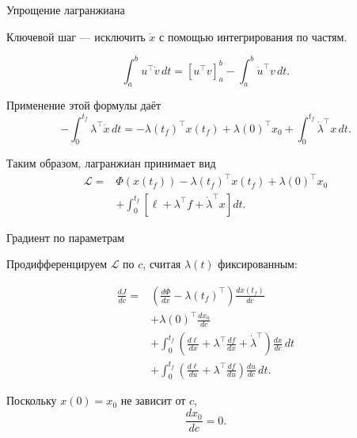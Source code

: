 \documentclass{beamer}
\begin{document}
	\begin{frame}{Упрощение лагранжиана}
		\begin{flushleft}
			Ключевой шаг --- исключить $\dot{x}$ с помощью интегрирования
			по частям.
			
			\begin{theorem}
				\[
				\int_a^b u^\top\dot{v}\,dt
				=
				\left[u^\top v\right]_a^b
				-\int_a^b \dot{u}^\top v\,dt.
				\]
			\end{theorem}
			
			Применение этой формулы даёт
			\[
			-\int_0^{t_f}\lambda^\top\dot{x}\,dt
			=
			-\lambda(t_f)^\top x(t_f)
			+\lambda(0)^\top x_0
			+\int_0^{t_f}\dot{\lambda}^\top x\,dt.
			\]
			
			Таким образом, лагранжиан принимает вид
			\[
			\boxed{
				\begin{aligned}
					\mathcal{L}
					={}&\Phi(x(t_f))-\lambda(t_f)^\top x(t_f)+\lambda(0)^\top x_0\\
					&+\int_0^{t_f}
					\left[\ell+\lambda^\top f+
					\dot{\lambda}^\top x\right]dt.
				\end{aligned}
			}
			\]
		\end{flushleft}
	\end{frame}
	
	\begin{frame}{Градиент по параметрам}
		\begin{flushleft}
			Продифференцируем $\mathcal{L}$ по $c$,
			считая $\lambda(t)$ фиксированным:
			
			\[
			\begin{aligned}
				\frac{dJ}{dc}
				={}&
				\left(\frac{d\Phi}{dx}
				-\lambda(t_f)^\top\right)
				\frac{dx(t_f)}{dc}\\
				&+\lambda(0)^\top\frac{dx_0}{dc}\\
				&+\int_0^{t_f}
				\left(
				\frac{d\ell}{dx}
				+\lambda^\top\frac{df}{dx}
				+\dot{\lambda}^\top
				\right)\frac{dx}{dc}\,dt\\
				&+\int_0^{t_f}
				\left(
				\frac{d\ell}{du}
				+\lambda^\top\frac{df}{du}
				\right)\frac{du}{dc}\,dt.
			\end{aligned}
			\]
			
			\bigskip
			
			Поскольку $x(0)=x_0$ не зависит от $c$,
			\[
			\frac{dx_0}{dc}=0.
			\]
		\end{flushleft}
	\end{frame}
	
\end{document}
